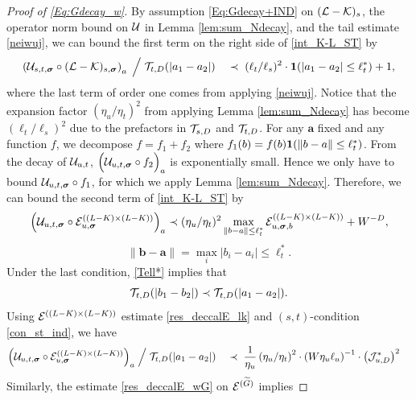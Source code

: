 \documentclass[10pt,reqno]{article}
\theoremstyle{plain} %
\theoremstyle{remark}
\numberwithin{equation}{section}
\begin{document}
\begin{proof}[Proof of \eqref{Eq:Gdecay_w}]
By  assumption \eqref{Eq:Gdecay+IND} on $({ \cal L-\cal K})_s$, the operator norm bound on $\cal U$ in Lemma \ref{lem:sum_Ndecay},  and the  tail estimate  \eqref{neiwuj}, 
we can  bound the first term on the right side  of \eqref{int_K-L_ST} by 
\begin{equation} \label{res_deccalE_0}
\left(\mathcal{U}_{s, t, \boldsymbol{\sigma}} \circ (\mathcal{L} - \mathcal{K})_{s, \boldsymbol{\sigma}}\right)_{\textbf{a}}\;\Big/\; 
  {\cal T}_{t, D}(|a_1-a_2|) \quad 
  \prec \;   (\ell_t/\ell_s)^2\cdot {\bf 1}(|a_1-a_2|\le \ell_t^*) + 1,
\end{equation}
where the last term of order one comes from applying \eqref{neiwuj}. Notice that the expansion factor $\left(\eta_u / \eta_t\right)^2$  from applying Lemma \ref{lem:sum_Ndecay} has become 
$ (\ell_t/\ell_s)^2$ due to the prefactors in $ {\cal T}_{s, D}$ and  ${\cal T}_{t, D}$.
For  any $\textbf{a}$ fixed and any function $f$,  we decompose $f  = f_1  + f_2   $ where 
$f_1 (\textbf{b}) = f (\textbf{b}) {\bf 1} ( \| \textbf{b}-\textbf{a}\|\le \ell_t^*) $. 
From the decay of ${\cal U}_{u,t}$,  $\Big ( {\cal U}_{u,t, \boldsymbol{\sigma}} \circ f_2 \Big)_\textbf{a}$ is exponentially small.  
Hence we only have to bound $  {\cal U}_{u,t, \boldsymbol{\sigma}} \circ f_1$, for which we apply  Lemma \ref{lem:sum_Ndecay}. Therefore,  
we can bound the second  term of \eqref{int_K-L_ST} by 
$$
 \Big({\cal U}_{u,t, \boldsymbol{\sigma}}\circ  {\cal E}^{( (L-K)\times(L-K) )}_{u, \boldsymbol{\sigma}}\Big)_\textbf{a}
 \prec (\eta_u/\eta_t)^2 \max_{\| \textbf{b}-\textbf{a}\|\le \ell_t^*}{\cal E}^{( (L-K)\times(L-K) )}_{u, \boldsymbol{\sigma}, \textbf{b}}+W^{-D}, 
$$
$$
 \|\textbf{b}-\textbf{a}\|=\max_i |b_i-a_i|\le \ell_t^*.
 $$
Under the last  condition, \eqref{Tell*} implies that 
$$
 {\cal T}_{t, D}(|b_1-b_2|)\prec  {\cal T}_{t, D}(|a_1-a_2|).
$$
Using  ${\cal E}^{( (L-K)\times(L-K) )}$ estimate  \eqref{res_deccalE_lk} and $(s,t)$-condition  \eqref{con_st_ind}, we have 
\begin{align} 
\label{res_deccalE_1}
     \Big({\cal U}_{u,t, \boldsymbol{\sigma}}\circ  {\cal E}^{( (L-K)\times(L-K) )}_{u, \boldsymbol{\sigma}}\Big)_\textbf{a}\;\Big/\; 
 {\cal T}_{t, D}(|a_1-a_2|) \quad 
  & \prec \; 
  \frac{1}{\eta_u}\left(\eta_u / \eta_t\right)^2 
   \cdot  
   \left(W\eta_u\ell_u\right)^{-1 }
    \cdot 
\left({\cal J}^*_{u,D}\right)^2
\end{align} 
Similarly,   the estimate \eqref{res_deccalE_wG} on ${\cal E}^{(\widetilde{G} )}$ implies   

\end{proof}
\end{document}
